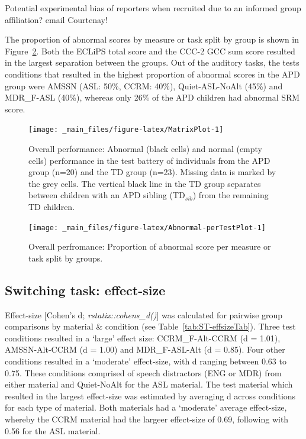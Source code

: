 \documentclass[a4paper, twoside]{templates/ociamthesis}
\begin{document}
\begin{correction}
{Potential experimental bias of reporters when recruited due to an
informed group affiliation? email Courtenay!}
\end{correction}

\hfill\break
The proportion of abnormal scores by measure or task split by group is shown in Figure~\ref{fig:Abnormal-perTestPlot}. Both the ECLiPS total score and the CCC-2 GCC sum score resulted in the largest separation between the groups. Out of the auditory tasks, the tests conditions that resulted in the highest proportion of abnormal scores in the APD group were AMSSN (ASL: 50\%, CCRM: 40\%), Quiet-ASL-NoAlt (45\%) and MDR\_F-ASL (40\%), whereas only 26\% of the APD children had abnormal SRM score.\\

\begin{figure}

{\centering \texttt{[image: \_main\_files/figure-latex/MatrixPlot-1]} 

}

\caption{Overall performance: Abnormal (black cells) and normal (empty cells) performance in the test battery of individuals from the APD group (n=20) and the TD group (n=23). Missing data is marked by the grey cells. The vertical black line in the TD group separates between children with an APD sibling (TD$_{sib}$) from the remaining TD children.}\label{fig:MatrixPlot}
\end{figure}

\begin{figure}

{\centering \texttt{[image: \_main\_files/figure-latex/Abnormal-perTestPlot-1]} 

}

\caption{Overall perfromance: Proportion of abnormal score per measure or task split by groups.}\label{fig:Abnormal-perTestPlot}
\end{figure}

\hypertarget{switching-task-effect-size}{%
\subsection{Switching task: effect-size}\label{switching-task-effect-size}}

\hfill\break
Effect-size {[}Cohen's d; \emph{rstatix::cohens\_d()}{]} was calculated for pairwise group comparisons by material \& condition (see Table~\ref{tab:ST-effsizeTab}). Three test conditions resulted in a `large' effect size: CCRM\_F-Alt-CCRM (d = 1.01), AMSSN-Alt-CCRM (d = 1.00) and MDR\_F-ASL-Alt (d = 0.85). Four other conditions resulted in a `moderate' effect-size, with d ranging between 0.63 to 0.75. These conditions comprised of speech distractors (ENG or MDR) from either material and Quiet-NoAlt for the ASL material. The test material which resulted in the largest effect-size was estimated by averaging d across conditions for each type of material. Both materials had a `moderate' average effect-size, whereby the CCRM material had the largeer effect-size of 0.69, following with 0.56 for the ASL material.\\
\end{document}

